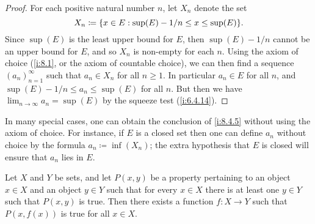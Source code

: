 \begin{proof}
  For each positive natural number \(n\), let \(X_n\) denote the set
  \[
    X_n \coloneqq \set{x \in E : \sup(E) - 1 / n \leq x \leq \sup(E)}.
  \]
  Since \(\sup(E)\) is the least upper bound for \(E\), then \(\sup(E) - 1 / n\) cannot be an upper bound for \(E\), and so \(X_n\) is non-empty for each \(n\).
  Using the axiom of choice (\cref{i:8.1}, or the axiom of countable choice), we can then find a sequence \((a_n)_{n = 1}^\infty\) such that \(a_n \in X_n\) for all \(n \geq 1\).
  In particular \(a_n \in E\) for all \(n\), and \(\sup(E) - 1 / n \leq a_n \leq \sup(E)\) for all \(n\).
  But then we have \(\lim_{n \to \infty} a_n = \sup(E)\) by the squeeze test (\cref{i:6.4.14}).
\end{proof}

\begin{rmk}\label{i:8.4.6}
  In many special cases, one can obtain the conclusion of \cref{i:8.4.5} without using the axiom of choice.
  For instance, if \(E\) is a closed set then one can define \(a_n\) without choice by the formula \(a_n \coloneqq \inf(X_n)\);
  the extra hypothesis that \(E\) is closed will ensure that \(a_n\) lies in \(E\).
\end{rmk}

\begin{prop}\label{i:8.4.7}
  Let \(X\) and \(Y\) be sets, and let \(P(x, y)\) be a property pertaining to an object \(x \in X\) and an object \(y \in Y\) such that for every \(x \in X\) there is at least one \(y \in Y\) such that \(P(x, y)\) is true.
  Then there exists a function \(f : X \to Y\) such that \(P(x, f(x))\) is true for all \(x \in X\).
\end{prop}


